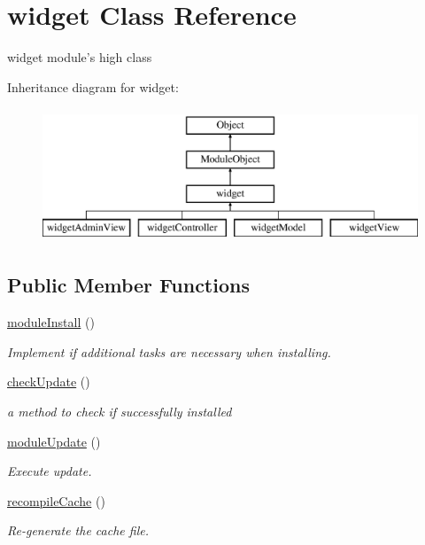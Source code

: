 \hypertarget{classwidget}{\section{widget Class Reference}
\label{classwidget}
}


widget module's high class  


Inheritance diagram for widget\+:\begin{figure}[H]
\begin{center}
\leavevmode
\includegraphics[height=4.000000cm]{classwidget}
\end{center}
\end{figure}
\subsection*{Public Member Functions}
\begin{DoxyCompactItemize}
\item 
\hyperlink{classwidget_ae5a0f29ef320000b10196c8ce3d1bcdc}{module\+Install} ()
\begin{DoxyCompactList}\small\item\em Implement if additional tasks are necessary when installing. \end{DoxyCompactList}\item 
\hyperlink{classwidget_a40ce2841fc3aa0dade2ce5609c08ea9e}{check\+Update} ()
\begin{DoxyCompactList}\small\item\em a method to check if successfully installed \end{DoxyCompactList}\item 
\hyperlink{classwidget_ae12b6e9bc84250539e3aa09c1e1e6f77}{module\+Update} ()
\begin{DoxyCompactList}\small\item\em Execute update. \end{DoxyCompactList}\item 
\hyperlink{classwidget_a958eb4fd79b5c9834f04d866bc6b5d02}{recompile\+Cache} ()
\begin{DoxyCompactList}\small\item\em Re-\/generate the cache file. \end{DoxyCompactList}\end{DoxyCompactItemize}
